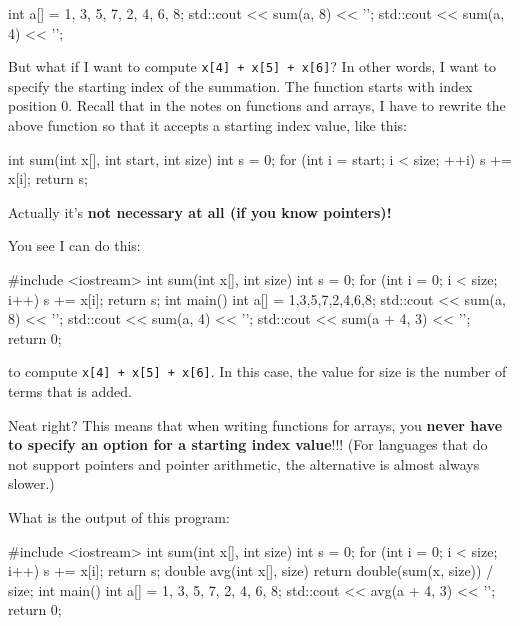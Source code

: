 \begin{consolethree}[escapeinside=||]
int a[] = {1, 3, 5, 7, 2, 4, 6, 8};
std::cout << sum(a, 8) << '\n';
std::cout << sum(a, 4) << '\n';
\end{consolethree}

But what if I want to compute \texttt{x[4] + x[5] + x[6]}? In
other words, I want to specify the starting index of the summation. The
function starts with index position 0. Recall that in the notes on
functions and arrays, I have to rewrite the above function so that it
accepts a starting index value, like this:

\begin{consolethree}[escapeinside=||]
int sum(int x[], int start, int size)
{
    int s = 0;
    for (int i = start; i < size; ++i)
    {
        s += x[i];
    }
    return s;
}
\end{consolethree}

Actually it's \textbf{not necessary at all (if you know
pointers)!}

You see I can do this:

\begin{consolethree}[escapeinside=||]
#include <iostream>
int sum(int x[], int size)
{
    int s = 0;
    for (int i = 0; i < size; i++)
    {
        s += x[i];
    }
    return s;
}
int main()
{
    int a[] = {1,3,5,7,2,4,6,8};
    std::cout << sum(a, 8) << '\n';
    std::cout << sum(a, 4) << '\n';
    std::cout << sum(a + 4, 3) << '\n';
    return 0;
}
\end{consolethree}

to compute \texttt{x[4] + x[5] + x[6]}. In this case, the
value for size is the number of terms that is added.

Neat right? This means that when writing functions for arrays, you
\textbf{never have to specify an option for a starting index value}!!!
(For languages that do not support pointers and pointer arithmetic, the
alternative is almost always slower.)

\begin{ex}
What is the output of this program:

\begin{consolethree}[escapeinside=||]
#include <iostream>
int sum(int x[], int size)
{
    int s = 0;
    for (int i = 0; i < size; i++)
    {
        s += x[i];
    }
    return s;
}
double avg(int x[], size)
{
    return double(sum(x, size)) / size;
}
int main()
{
    int a[] = {1, 3, 5, 7, 2, 4, 6, 8};
    std::cout << avg(a + 4, 3) << '\n';
    return 0;
}
\end{consolethree}
\end{ex}

